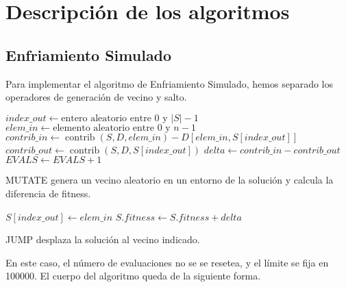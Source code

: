\documentclass{article}
\begin{document}
\pagebreak

\section{Descripción de los algoritmos}

\subsection{Enfriamiento Simulado}

Para implementar el algoritmo de Enfriamiento Simulado, hemos separado los operadores de generación de vecino y
salto. 

\begin{algorithm}[H]
	\DontPrintSemicolon %
	$index\_out\gets\text{entero aleatorio entre 0 y $|S|-1$}$\;
	$elem\_in\gets\text{elemento aleatorio entre 0 y $n-1$}$\;
	$contrib\_in\gets\operatorname{contrib}(S,D,elem\_in)-D[elem\_in,S[index\_out]]$
	$contrib\_out\gets\operatorname{contrib}(S,D,S[index\_out])$\;
	$delta\gets contrib\_in-contrib\_out$\;
	$EVALS\gets EVALS+1$\;
	\;
	\;
	\;
	\caption{{\sc MUTATE} genera un vecino aleatorio en un entorno de la solución y calcula la diferencia de fitness.}
	\label{alg:mutate-es}
\end{algorithm}

\begin{algorithm}[H]
	\DontPrintSemicolon %
	$S[index\_out]\gets elem\_in$\;
	$S.fitness\gets S.fitness+delta$\;	
	\caption{{\sc JUMP} desplaza la solución al vecino indicado.}
	\label{alg:jump-es}
\end{algorithm}

En este caso, el número de evaluaciones no se se resetea, y el límite se fija en 100000.
El cuerpo del algoritmo queda de la siguiente forma.
\end{document}

